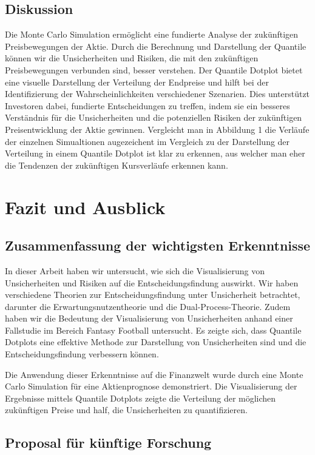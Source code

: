 \subsection{Diskussion}
Die Monte Carlo Simulation ermöglicht eine fundierte Analyse der zukünftigen Preisbewegungen der Aktie. Durch die Berechnung und Darstellung der Quantile können wir die Unsicherheiten und Risiken, die mit den zukünftigen Preisbewegungen verbunden sind, besser verstehen. Der Quantile Dotplot bietet eine visuelle Darstellung der Verteilung der Endpreise und hilft bei der Identifizierung der Wahrscheinlichkeiten verschiedener Szenarien. Dies unterstützt Investoren dabei, fundierte Entscheidungen zu treffen, indem sie ein besseres Verständnis für die Unsicherheiten und die potenziellen Risiken der zukünftigen Preisentwicklung der Aktie gewinnen.
Vergleicht man in Abbildung 1 die Verläufe der einzelnen Simualtionen augezeichent im Vergleich zu der Darstellung der Verteilung in einem Quantile Dotplot ist klar zu erkennen, aus welcher man eher die Tendenzen der zukünftigen Kursverläufe erkennen kann.

\section{Fazit und Ausblick}

\subsection{Zusammenfassung der wichtigsten Erkenntnisse}

In dieser Arbeit haben wir untersucht, wie sich die Visualisierung von Unsicherheiten und Risiken auf die Entscheidungsfindung auswirkt. Wir haben verschiedene Theorien zur Entscheidungsfindung unter Unsicherheit betrachtet, darunter die Erwartungsnutzentheorie und die Dual-Process-Theorie. Zudem haben wir die Bedeutung der Visualisierung von Unsicherheiten anhand einer Fallstudie im Bereich Fantasy Football untersucht. Es zeigte sich, dass Quantile Dotplots eine effektive Methode zur Darstellung von Unsicherheiten sind und die Entscheidungsfindung verbessern können.

Die Anwendung dieser Erkenntnisse auf die Finanzwelt wurde durch eine Monte Carlo Simulation für eine Aktienprognose demonstriert. Die Visualisierung der Ergebnisse mittels Quantile Dotplots zeigte die Verteilung der möglichen zukünftigen Preise und half, die Unsicherheiten zu quantifizieren.

\subsection{Proposal für künftige Forschung}

